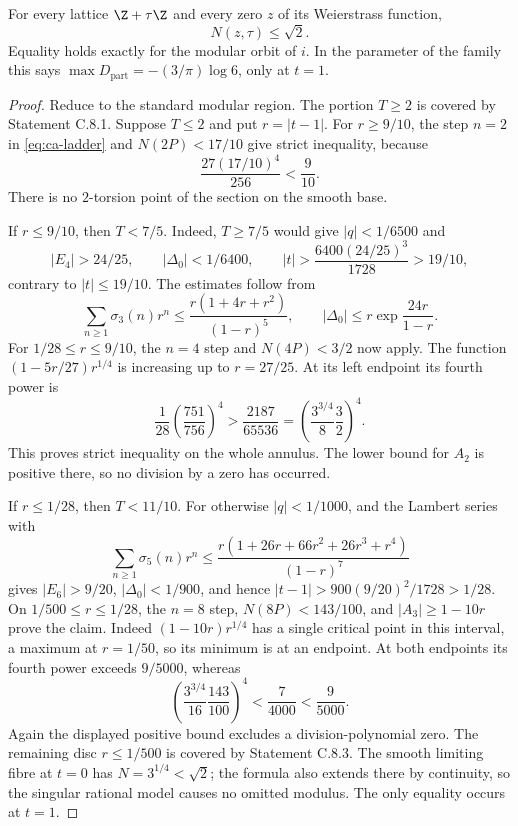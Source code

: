 \begin{statement}
For every lattice $\Z+\tau\Z$ and every zero $z$ of its
Weierstrass function,
\[
 N(z,\tau)\le\sqrt2.
\]
Equality holds exactly for the modular orbit of $i$.
In the parameter of the family this says
$\max D_{\mathrm{part}}=-(3/\pi)\log6$, only at $t=1$.
\end{statement}
\begin{proof}
Reduce to the standard modular region. The portion $T\ge2$
is covered by Statement C.8.1. Suppose $T\le2$ and put
$r=|t-1|$. For $r\ge9/10$, the step $n=2$ in
\eqref{eq:ca-ladder} and $N(2P)<17/10$ give strict inequality,
because
\[
 \frac{27(17/10)^4}{256}<\frac9{10}.
\]
There is no $2$-torsion point of the section on the smooth base.

If $r\le9/10$, then $T<7/5$. Indeed, $T\ge7/5$ would give
$|q|<1/6500$ and
\[
 |E_4|>24/25,\qquad |\Delta_0|<1/6400,
 \qquad |t|>\frac{6400(24/25)^3}{1728}>19/10,
\]
contrary to $|t|\le19/10$. The estimates follow from
\[
 \sum_{n\ge1}\sigma_3(n)r^n
 \le\frac{r(1+4r+r^2)}{(1-r)^5},\qquad
 |\Delta_0|\le r\exp\frac{24r}{1-r}.
\]
For $1/28\le r\le9/10$, the $n=4$ step and
$N(4P)<3/2$ now apply. The function
$(1-5r/27)r^{1/4}$ is increasing up to $r=27/25$.
At its left endpoint its fourth power is
\[
 \frac1{28}\left(\frac{751}{756}\right)^4
 >\frac{2187}{65536}
 =\left(\frac{3^{3/4}}8\frac32\right)^4.
\]
This proves strict inequality on the whole annulus. The lower
bound for $A_2$ is positive there, so no division by a zero has
occurred.

If $r\le1/28$, then $T<11/10$. For otherwise $|q|<1/1000$,
and the Lambert series with
\[
 \sum_{n\ge1}\sigma_5(n)r^n
 \le\frac{r(1+26r+66r^2+26r^3+r^4)}{(1-r)^7}
\]
gives $|E_6|>9/20$, $|\Delta_0|<1/900$, and hence
$|t-1|>900(9/20)^2/1728>1/28$.
On $1/500\le r\le1/28$, the $n=8$ step,
$N(8P)<143/100$, and $|A_3|\ge1-10r$ prove the claim.
Indeed $(1-10r)r^{1/4}$ has a single critical point in this
interval, a maximum at $r=1/50$, so its minimum is at an endpoint.
At both endpoints its fourth power exceeds $9/5000$, whereas
\[
 \left(\frac{3^{3/4}}{16}\frac{143}{100}\right)^4
 <\frac7{4000}<\frac9{5000}.
\]
Again the displayed positive bound excludes a division-polynomial
zero. The remaining disc $r\le1/500$ is covered by Statement
C.8.3. The smooth limiting fibre at $t=0$ has
$N=3^{1/4}<\sqrt2$; the formula also extends there by
continuity, so the singular rational model causes no omitted
modulus. The only equality occurs at $t=1$.
\end{proof}
